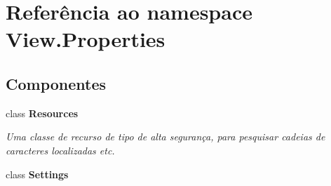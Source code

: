 \hypertarget{namespace_view_1_1_properties}{}\section{Referência ao namespace View.\+Properties}
\label{namespace_view_1_1_properties}
\subsection*{Componentes}
\begin{DoxyCompactItemize}
\item 
class {\bfseries Resources}
\begin{DoxyCompactList}\small\item\em Uma classe de recurso de tipo de alta segurança, para pesquisar cadeias de caracteres localizadas etc. \end{DoxyCompactList}\item 
class {\bfseries Settings}
\end{DoxyCompactItemize}
